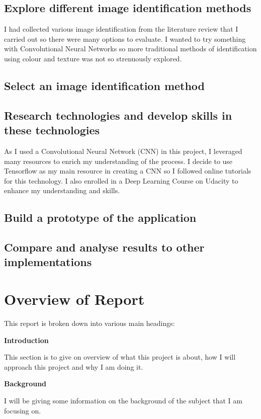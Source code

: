 \subsection{ Explore different image identification methods}
I had collected various image identification from the literature review that I carried out so there were many options to evaluate.
I wanted to try something with Convolutional Neural Networks so more traditional
methods of identification using colour and texture was not so strenuously explored.

\subsection{Select an image identification method}

\subsection{Research technologies and develop skills in these technologies}
As I used a Convolutional Neural Network (CNN) in this project, I leveraged many resources to enrich my understanding of the process.
I decide to use Tensorflow as my main resource in creating a CNN so I followed online tutorials for this technology.
I also enrolled in a Deep Learning Course on Udacity to enhance my understanding and skills.

\subsection{Build a prototype of the application}

\subsection{Compare and analyse results to other implementations}


\section{Overview of Report}

This report is broken down into various main headings:

\textbf{Introduction}

This section is to give on overview of what this project is about, how I will approach this project and why I am doing it.

\textbf{Background}

I will be giving some information on the background of the subject that I am focusing on.

